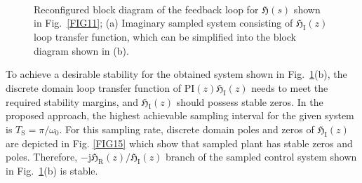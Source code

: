 \documentclass[journal,a4paper,10pt,twoside]{IEEEtran} %
\begin{document}
	 \begin{figure}
	    \begin{center}
	        \\
	                \vspace{-3mm}
	    \end{center}
	    \vspace{-3mm}
	    \caption{Reconfigured block diagram of the feedback loop for $\mathfrak{H}(s)$ shown in Fig.~\ref{FIG11}; (a) Imaginary sampled system consisting of $\mathfrak{H}_\mathrm{I}(z)$ loop transfer function, which can be simplified into the block diagram shown in (b).}
	    \label{FIG14}
	    \vspace{-3mm}
	\end{figure}
	 
	 
	 To achieve a desirable stability for the obtained system shown in Fig.~\ref{FIG14}(b), the discrete domain loop transfer function of $\mathrm{PI}(z)\mathfrak{H}_\mathrm{I}(z)$ needs to meet the required stability margins, and $\mathfrak{H}_\mathrm{I}(z)$ should possess stable zeros. {\color{red}In the proposed approach, the highest achievable sampling interval for the given system is $T_\mathrm{S}=\pi/\omega_0$.} For this sampling rate, discrete domain poles and zeros of $\mathfrak{H}_\mathrm{I}(z)$ are depicted in Fig. \ref{FIG15} which show that sampled plant has stable zeros and poles. Therefore, $-\mathrm{j}{\mathfrak{H}_\mathrm{R}(z)}/{\mathfrak{H}_\mathrm{I}(z)}$ branch of the sampled control system shown in Fig.~\ref{FIG14}(b) is stable.
	 
\end{document}

